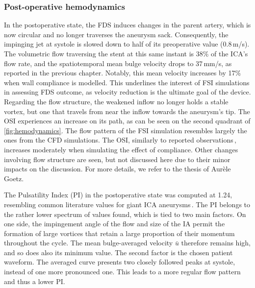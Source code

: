 \subsubsection*{Post-operative hemodynamics}
In the postoperative state, the FDS induces changes in the parent artery, which is now circular and no longer traverses the aneurysm sack. Consequently, the impinging jet at systole is slowed down to half of its preoperative value (0.8\,m/s). The volumetric flow traversing the stent at this same instant is 38\% of the ICA's flow rate, and the spatiotemporal mean bulge velocity drops to 37\,mm/s, as reported in the previous chapter. Notably, this mean velocity increases by 17\% when wall compliance is modelled. This underlines the interest of FSI simulations in assessing FDS outcome, as velocity reduction is the ultimate goal of the device. Regarding the flow structure, the weakened inflow no longer holds a stable vortex, but one that travels from near the inflow towards the aneurysm's tip. The OSI experiences an increase on its path, as can be seen on the second quadrant of \autoref{fig:hemodynamics}. The flow pattern of the FSI simulation resembles largely the ones from the CFD simulations. The OSI, similarly to reported observations\,\cite{Aurele}, increases moderately when simulating the effect of compliance. Other changes involving flow structure are seen, but not discussed here due to their minor impacts on the discussion. For more details, we refer to the thesis of Aurèle Goetz.

The Pulsatility Index (PI) in the postoperative state was computed at 1.24, resembling common literature values for giant ICA aneurysms\,\cite{Larrabide2016}. The PI belongs to the rather lower spectrum of values found, which is tied to two main factors. On one side, the impingement angle of the flow and size of the IA permit the formation of large vortices that retain a large proportion of their momentum throughout the cycle. The mean bulge-averaged velocity $\bar{u}$ therefore remains high, and so does also its minimum value. The second factor is the chosen patient waveform. The averaged curve presents two closely followed peaks at systole, instead of one more pronounced one. This leads to a more regular flow pattern and thus a lower PI\@.

